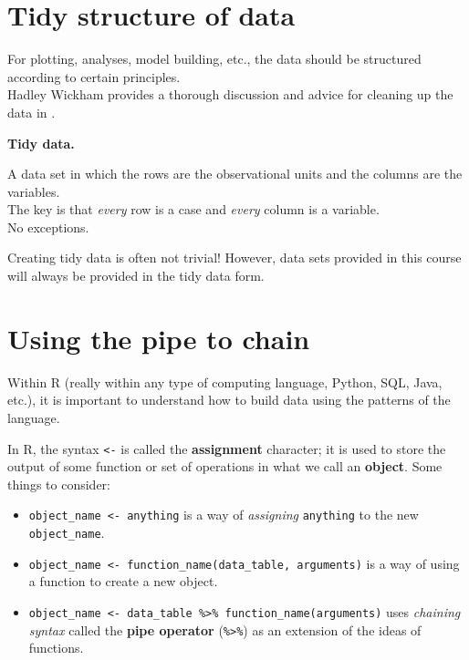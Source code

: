 \documentclass[
  10pt,
  openany]{book}
\providecommand{\tightlist}{%
  \setlength{\itemsep}{0pt}\setlength{\parskip}{0pt}}
\theoremstyle{definition}
\theoremstyle{definition}
\theoremstyle{definition}
\theoremstyle{definition}
\theoremstyle{remark}
\begin{document}
\section{Tidy structure of data}\label{datastruc}

For plotting, analyses, model building, etc., the data should be structured according to certain principles.\\
Hadley Wickham provides a thorough discussion and advice for cleaning up the data in \citet{wickham2014}.

\textbf{Tidy data.}

A data set in which the rows are the observational units and the columns are the variables.\\
The key is that \emph{every} row is a case and \emph{every} column is a variable.\\
No exceptions.

Creating tidy data is often not trivial! However, data sets provided in this course will always be provided in the tidy data form.

\section{Using the pipe to chain}\label{using-the-pipe-to-chain}

Within R (really within any type of computing language, Python, SQL, Java, etc.), it is important to understand how to build data using the patterns of the language.

In R, the syntax \texttt{\textless{}-} is called the \textbf{assignment} character; it is used to store the output of some function or set of operations in what we call an \textbf{object}. Some things to consider:

\begin{itemize}
\tightlist
\item
  \texttt{object\_name\ \textless{}-\ anything} is a way of \emph{assigning} \texttt{anything} to the new \texttt{object\_name}.
\item
  \texttt{object\_name\ \textless{}-\ function\_name(data\_table,\ arguments)} is a way of using a function to create a new object.
\item
  \texttt{object\_name\ \textless{}-\ data\_table\ \%\textgreater{}\%\ function\_name(arguments)} uses \emph{chaining syntax} called the \textbf{pipe operator} (\texttt{\%\textgreater{}\%}) as an extension of the ideas of functions.
\end{itemize}
\end{document}
